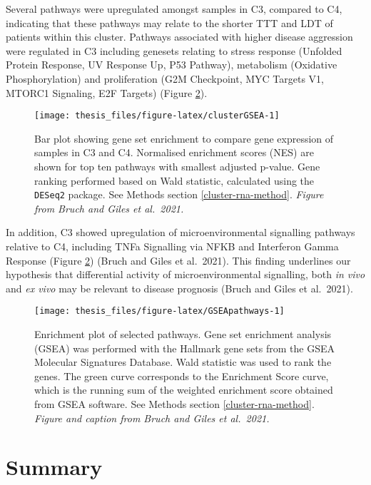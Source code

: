 \documentclass[11pt, a4paper, twosided]{book}
\begin{document}
Several pathways were upregulated amongst samples in C3, compared to C4, indicating that these pathways may relate to the shorter TTT and LDT of patients within this cluster. Pathways associated with higher disease aggression were regulated in C3 including genesets relating to stress response (Unfolded Protein Response, UV Response Up, P53 Pathway), metabolism (Oxidative Phosphorylation) and proliferation (G2M Checkpoint, MYC Targets V1, MTORC1 Signaling, E2F Targets) (Figure \ref{fig:GSEApathways}).


\begin{figure}

{\centering \texttt{[image: thesis\_files/figure-latex/clusterGSEA-1]} 

}

\caption{Bar plot showing gene set enrichment to compare gene expression of samples in C3 and C4. Normalised enrichment scores (NES) are shown for top ten pathways with smallest adjusted p-value. Gene ranking performed based on Wald statistic, calculated using the \texttt{DESeq2} package. See Methods section \ref{cluster-rna-method}. \emph{Figure from Bruch and Giles et al.~2021. }}\label{fig:clusterGSEA}
\end{figure}
In addition, C3 showed upregulation of microenvironmental signalling pathways relative to C4, including TNFa Signalling via NFKB and Interferon Gamma Response (Figure \ref{fig:GSEApathways}) (Bruch and Giles et al.~2021). This finding underlines our hypothesis that differential activity of microenvironmental signalling, both \emph{in vivo} and \emph{ex vivo} may be relevant to disease prognosis (Bruch and Giles et al.~2021).


\begin{figure}

{\centering \texttt{[image: thesis\_files/figure-latex/GSEApathways-1]} 

}

\caption{Enrichment plot of selected pathways. Gene set enrichment analysis (GSEA) was performed with the Hallmark gene sets from the GSEA Molecular Signatures Database. Wald statistic was used to rank the genes. The green curve corresponds to the Enrichment Score curve, which is the running sum of the weighted enrichment score obtained from GSEA software. See Methods section \ref{cluster-rna-method}. \emph{Figure and caption from Bruch and Giles et al.~2021.}}\label{fig:GSEApathways}
\end{figure}
\hypertarget{summary}{%
\section{Summary}\label{summary}}
\end{document}
